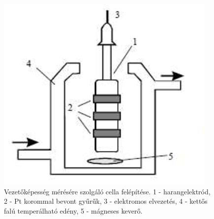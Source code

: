 \begin{figure}
\centering
\includegraphics{cond.eps}
\caption{Vezetőképesség mérésére szolgáló cella felépítése. 1 - harangelektród, 2 - Pt korommal bevont gyűrűk, 3 - elektromos elvezetés, 4 - kettős falú temperálható edény, 5 - mágneses keverő.}
\label{fig:vez}
\end{figure}


